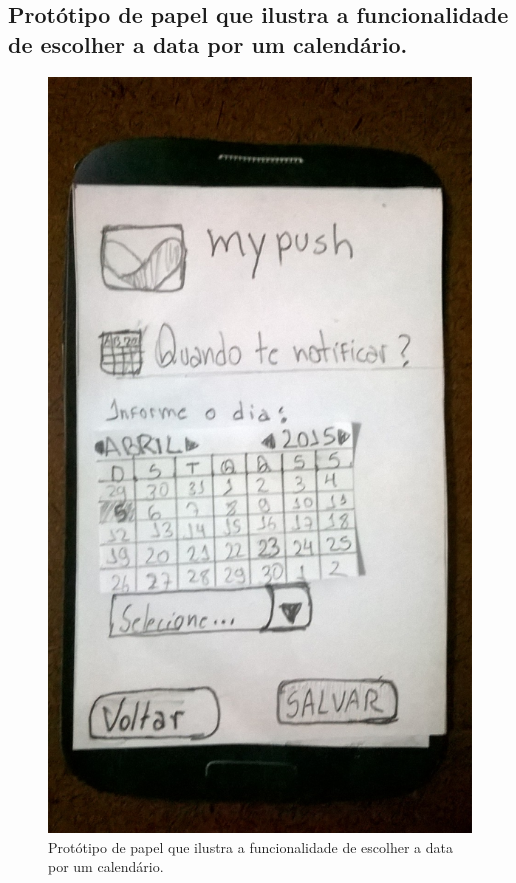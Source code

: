 \begin{apendicesenv}
    \pagebreak
    \section*{Protótipo de papel que ilustra a funcionalidade de escolher a data por um calendário.}
    
      \begin{figure}[!htbp]
	\centering
	\includegraphics[scale=0.32, angle=-90]{editaveis/figuras/prototipo_papel_v1/quando_notificar_data}
	\caption{Protótipo de papel que ilustra a funcionalidade de escolher a data por um calendário.}
	\label{quando_notificar_data_v1}
      \end{figure}
    

\end{apendicesenv}
